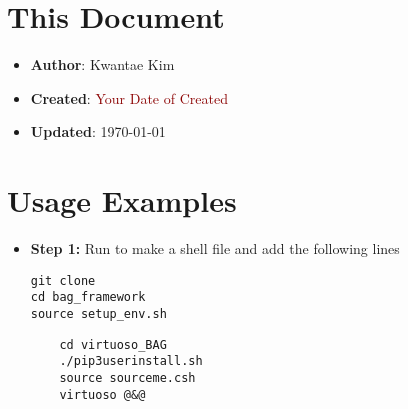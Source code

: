 \documentclass[a4paper,12pt]{article}
\begin{document}
\section{This Document}

\begin{itemize}
    \item \textbf{Author}: Kwantae Kim
    \item \textbf{Created}: \textcolor{darkred}{Your Date of Created}
    \item \textbf{Updated}: \today
\end{itemize}

\pagebreak


\section{Usage Examples}

\begin{itemize}
    \item[\footnotesize\faCode] \textbf{Step 1:} Run  to make a shell file and add the following lines
          \vspace{-1em}\begin{verbatim}
git clone
cd bag_framework
source setup_env.sh
        \end{verbatim}
          \vspace{-1em}\begin{verbatim}
    cd virtuoso_BAG
    ./pip3userinstall.sh
    source sourceme.csh
    virtuoso @&@
        \end{verbatim}
\end{itemize}


\label{lastpage}
\end{document}
